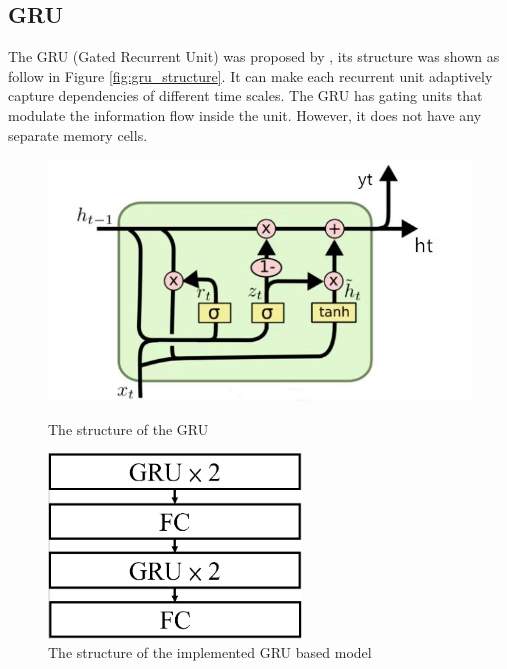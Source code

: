 \documentclass[11pt]{article}
\begin{document}
\subsection{GRU}

The GRU (Gated Recurrent Unit) was proposed by \cite{cho2014properties}, its structure was shown as follow in Figure \ref{fig:gru_structure}. It can make each recurrent unit adaptively capture dependencies of different time scales. The GRU has gating units that modulate the information flow inside the unit. However, it does not have any separate memory cells.

\begin{figure}[htbp]
	\centering
	\begin{minipage}[t]{0.48\textwidth}
		\centering
		\includegraphics[width=1.0\textwidth]{./imgs/gru1.jpg}
		\caption{The structure of the GRU}
    	\label{fig:gru_structure}
	\end{minipage}
	\begin{minipage}[t]{0.48\textwidth}
		\centering
		\includegraphics[width=0.6\textwidth]{./imgs/gru2.png}
		\caption{The structure of the implemented GRU based model}
    	\label{fig:implemented_gru_based_structure}
	\end{minipage}
\end{figure}
\end{document}
